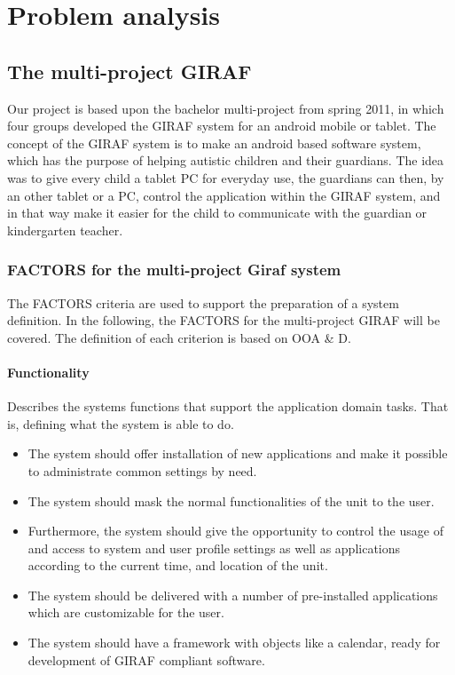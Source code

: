 \chapter{Problem analysis}

\section{The multi-project GIRAF}
Our project is based upon the bachelor multi-project from spring 2011, in which four groups developed the GIRAF system for an android mobile or tablet. The concept of the GIRAF system is to make an android based software system, which has the purpose of helping autistic children and their guardians. The idea was to give every child a tablet PC for everyday use, the guardians can then, by an other tablet or a PC, control the application within the GIRAF system, and in that way make it easier for the child to communicate with the guardian or kindergarten teacher. 

\subsection{FACTORS for the multi-project Giraf system}
The FACTORS criteria are used to support the preparation of a system definition. In the following, the FACTORS for the multi-project GIRAF will be covered. The definition of each criterion is based on OOA \& D.

\subsubsection{Functionality} 
Describes the systems functions that support the application domain tasks. That is, defining
what the system is able to do.
\begin{itemize}
	\item The system should offer installation of new applications and make it possible to administrate common settings by need. 
	\item The system should mask the normal functionalities of the unit to the user.
	\item Furthermore, the system should give the opportunity to control the usage of and access to system and user profile settings as well as applications according to the current time, and location of the unit.
	\item The system should be delivered with a number of pre-installed applications which are customizable for the user.
	\item The system should have a framework with objects like a calendar, ready for development of GIRAF compliant software.
\end{itemize}

